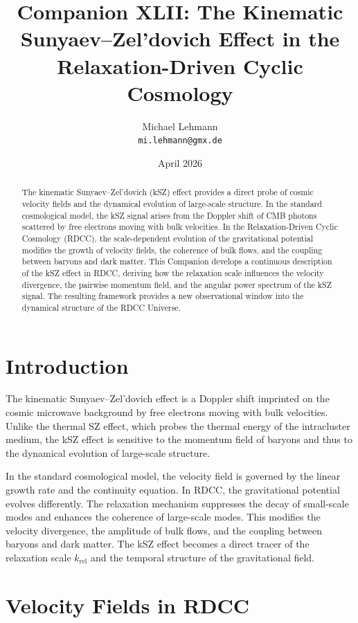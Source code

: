 \documentclass[11pt,a4paper]{article}
\title{\textbf{Companion XLII: The Kinematic Sunyaev--Zel'dovich Effect in the Relaxation-Driven Cyclic Cosmology}}
\author{Michael Lehmann \\ \texttt{mi.lehmann@gmx.de}}
\date{April 2026}
\begin{document}
\maketitle

\begin{abstract}
The kinematic Sunyaev--Zel'dovich (kSZ) effect provides a direct probe of cosmic 
velocity fields and the dynamical evolution of large-scale structure. In the 
standard cosmological model, the kSZ signal arises from the Doppler shift of CMB 
photons scattered by free electrons moving with bulk velocities. In the 
Relaxation-Driven Cyclic Cosmology (RDCC), the scale-dependent evolution of the 
gravitational potential modifies the growth of velocity fields, the coherence of 
bulk flows, and the coupling between baryons and dark matter. This Companion 
develops a continuous description of the kSZ effect in RDCC, deriving how the 
relaxation scale influences the velocity divergence, the pairwise momentum field, 
and the angular power spectrum of the kSZ signal. The resulting framework provides 
a new observational window into the dynamical structure of the RDCC Universe.
\end{abstract}
\section{Introduction}

The kinematic Sunyaev--Zel'dovich effect is a Doppler shift imprinted on the cosmic 
microwave background by free electrons moving with bulk velocities. Unlike the 
thermal SZ effect, which probes the thermal energy of the intracluster medium, the 
kSZ effect is sensitive to the momentum field of baryons and thus to the dynamical 
evolution of large-scale structure.

In the standard cosmological model, the velocity field is governed by the linear 
growth rate and the continuity equation. In RDCC, the gravitational potential 
evolves differently. The relaxation mechanism suppresses the decay of small-scale 
modes and enhances the coherence of large-scale modes. This modifies the velocity 
divergence, the amplitude of bulk flows, and the coupling between baryons and dark 
matter. The kSZ effect becomes a direct tracer of the relaxation scale 
$k_{\mathrm{rel}}$ and the temporal structure of the gravitational field.
\section{Velocity Fields in RDCC}
\end{document}
